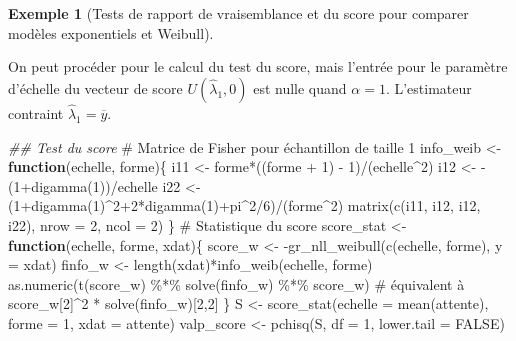 \documentclass[
  11pt,
  letterpaper,
]{scrbook}
\newenvironment{Shaded}{\begin{snugshade}}{\end{snugshade}}
\newcommand{\AttributeTok}[1]{\textcolor[rgb]{0.40,0.45,0.13}{#1}}
\newcommand{\CommentTok}[1]{\textcolor[rgb]{0.37,0.37,0.37}{#1}}
\newcommand{\ConstantTok}[1]{\textcolor[rgb]{0.56,0.35,0.01}{#1}}
\newcommand{\ControlFlowTok}[1]{\textcolor[rgb]{0.00,0.23,0.31}{\textbf{#1}}}
\newcommand{\DecValTok}[1]{\textcolor[rgb]{0.68,0.00,0.00}{#1}}
\newcommand{\DocumentationTok}[1]{\textcolor[rgb]{0.37,0.37,0.37}{\textit{#1}}}
\newcommand{\FunctionTok}[1]{\textcolor[rgb]{0.28,0.35,0.67}{#1}}
\newcommand{\NormalTok}[1]{\textcolor[rgb]{0.00,0.23,0.31}{#1}}
\newcommand{\OtherTok}[1]{\textcolor[rgb]{0.00,0.23,0.31}{#1}}
\newcommand{\SpecialCharTok}[1]{\textcolor[rgb]{0.37,0.37,0.37}{#1}}
\theoremstyle{plain}
\theoremstyle{plain}
\theoremstyle{definition}
\newtheorem{example}{Exemple}[chapter]
\theoremstyle{definition}
\theoremstyle{remark}
\begin{document}
\begin{example}[Tests de rapport de vraisemblance et du score pour
comparer modèles exponentiels et
Weibull]\protect\hypertarget{exm-weibull-scoretest}{}\label{exm-weibull-scoretest}

On peut procéder pour le calcul du test du score, mais l'entrée pour le
paramètre d'échelle du vecteur de score \(U({\widehat{\lambda}_1}, 0)\)
est nulle quand \(\alpha=1.\) L'estimateur contraint
\(\widehat{\lambda}_1=\overline{y}.\)

\begin{Shaded}
\begin{Highlighting}[]
\DocumentationTok{\#\# Test du score}
\CommentTok{\# Matrice de Fisher pour échantillon de taille 1}
\NormalTok{info\_weib }\OtherTok{\textless{}{-}} \ControlFlowTok{function}\NormalTok{(echelle, forme)\{ }
\NormalTok{  i11 }\OtherTok{\textless{}{-}}\NormalTok{ forme}\SpecialCharTok{*}\NormalTok{((forme }\SpecialCharTok{+} \DecValTok{1}\NormalTok{) }\SpecialCharTok{{-}} \DecValTok{1}\NormalTok{)}\SpecialCharTok{/}\NormalTok{(echelle}\SpecialCharTok{\^{}}\DecValTok{2}\NormalTok{)}
\NormalTok{  i12 }\OtherTok{\textless{}{-}} \SpecialCharTok{{-}}\NormalTok{(}\DecValTok{1}\SpecialCharTok{+}\FunctionTok{digamma}\NormalTok{(}\DecValTok{1}\NormalTok{))}\SpecialCharTok{/}\NormalTok{echelle}
\NormalTok{  i22 }\OtherTok{\textless{}{-}}\NormalTok{ (}\DecValTok{1}\SpecialCharTok{+}\FunctionTok{digamma}\NormalTok{(}\DecValTok{1}\NormalTok{)}\SpecialCharTok{\^{}}\DecValTok{2}\SpecialCharTok{+}\DecValTok{2}\SpecialCharTok{*}\FunctionTok{digamma}\NormalTok{(}\DecValTok{1}\NormalTok{)}\SpecialCharTok{+}\NormalTok{pi}\SpecialCharTok{\^{}}\DecValTok{2}\SpecialCharTok{/}\DecValTok{6}\NormalTok{)}\SpecialCharTok{/}\NormalTok{(forme}\SpecialCharTok{\^{}}\DecValTok{2}\NormalTok{)}
  \FunctionTok{matrix}\NormalTok{(}\FunctionTok{c}\NormalTok{(i11, i12, i12, i22), }\AttributeTok{nrow =} \DecValTok{2}\NormalTok{, }\AttributeTok{ncol =} \DecValTok{2}\NormalTok{)}
\NormalTok{\}}
\CommentTok{\# Statistique du score}
\NormalTok{score\_stat }\OtherTok{\textless{}{-}} \ControlFlowTok{function}\NormalTok{(echelle, forme, xdat)\{}
\NormalTok{  score\_w }\OtherTok{\textless{}{-}} \SpecialCharTok{{-}}\FunctionTok{gr\_nll\_weibull}\NormalTok{(}\FunctionTok{c}\NormalTok{(echelle, forme), }\AttributeTok{y =}\NormalTok{ xdat)}
\NormalTok{  finfo\_w }\OtherTok{\textless{}{-}} \FunctionTok{length}\NormalTok{(xdat)}\SpecialCharTok{*}\FunctionTok{info\_weib}\NormalTok{(echelle, forme)}
  \FunctionTok{as.numeric}\NormalTok{(}\FunctionTok{t}\NormalTok{(score\_w) }\SpecialCharTok{\%*\%} \FunctionTok{solve}\NormalTok{(finfo\_w) }\SpecialCharTok{\%*\%}\NormalTok{ score\_w)}
  \CommentTok{\# équivalent à score\_w[2]\^{}2 * solve(finfo\_w)[2,2]}
\NormalTok{\}}
\NormalTok{S }\OtherTok{\textless{}{-}} \FunctionTok{score\_stat}\NormalTok{(}\AttributeTok{echelle =} \FunctionTok{mean}\NormalTok{(attente), }\AttributeTok{forme =} \DecValTok{1}\NormalTok{, }\AttributeTok{xdat =}\NormalTok{ attente)}
\NormalTok{valp\_score }\OtherTok{\textless{}{-}} \FunctionTok{pchisq}\NormalTok{(S, }\AttributeTok{df =} \DecValTok{1}\NormalTok{, }\AttributeTok{lower.tail =} \ConstantTok{FALSE}\NormalTok{)}


\end{Highlighting}
\end{Shaded}
\end{example}
\end{document}
